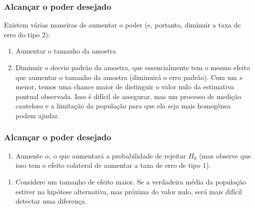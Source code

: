 
\begin{frame}
\frametitle{Alcançar o poder desejado}
\justifying
Existem várias maneiras de aumentar o poder (e, portanto, diminuir a taxa de erro do tipo 2):

\pause

\begin{enumerate}
\justifying
\item Aumentar o tamanho da amostra

\pause
\justifying
\item Diminuir o desvio padrão da amostra, que essencialmente tem o mesmo efeito que aumentar o tamanho da amostra (diminuirá o erro padrão). Com um $s$ menor, temos uma chance maior de distinguir o valor nulo da estimativa pontual observada. Isso é difícil de assegurar, mas um processo de medição cauteloso e a limitação da população para que ela seja mais homogênea podem ajudar.

\end{enumerate}
\end{frame}

\begin{frame}
\frametitle{Alcançar o poder desejado}

\begin{enumerate}[3.]

\justifying
\item Aumente $\alpha$, o que aumentará a probabilidade de rejeitar $H_0$ (mas observe que isso tem o efeito colateral de aumentar a taxa de erro de tipo 1).

\end{enumerate}


\pause
\begin{enumerate}[4.]
\justifying
\item Considere um tamanho de efeito maior. Se a verdadeira média da população estiver na hipótese alternativa, mas próxima do valor nulo, será mais difícil detectar uma diferença.

\end{enumerate}


\end{frame}


